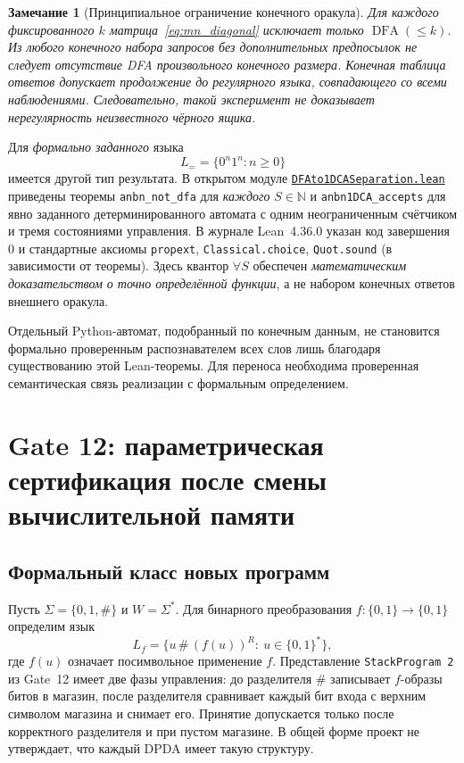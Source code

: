 \documentclass[11pt,a4paper]{article}
\newtheorem{remark}{Замечание}[section]
\newcommand{\DFA}{\operatorname{DFA}}
\begin{document}
\begin{remark}[Принципиальное ограничение конечного оракула]\label{rem:oracle}
Для каждого \emph{фиксированного} $k$ матрица~\eqref{eq:mn_diagonal} исключает только $\DFA(\le k)$. Из любого конечного набора запросов без дополнительных предпосылок \emph{не следует} отсутствие DFA произвольного конечного размера. Конечная таблица ответов допускает продолжение до регулярного языка, совпадающего со всеми наблюдениями. Следовательно, такой эксперимент не доказывает нерегулярность неизвестного чёрного ящика.
\end{remark}

Для \emph{формально заданного} языка
\begin{equation}\label{eq:anbn}
L_{=}=\{0^n1^n:n\ge0\}
\end{equation}
имеется другой тип результата. В открытом модуле \href{https://github.com/Dnarts/proof-carrying-discovery/blob/main/formal/DFAto1DCASeparation.lean}{\texttt{DFAto1DCASeparation.lean}} приведены теоремы \texttt{anbn\_not\_dfa} для \emph{каждого} $S\in\mathbb N$ и \texttt{anbn1DCA\_accepts} для явно заданного детерминированного автомата с одним неограниченным счётчиком и тремя состояниями управления. В журнале Lean~4.36.0 указан код завершения $0$ и стандартные аксиомы \texttt{propext}, \texttt{Classical.choice}, \texttt{Quot.sound} (в зависимости от теоремы). Здесь квантор $\forall S$ обеспечен \emph{математическим доказательством о точно определённой функции}, а не набором конечных ответов внешнего оракула.

Отдельный Python-автомат, подобранный по конечным данным, не становится формально проверенным распознавателем всех слов лишь благодаря существованию этой Lean-теоремы. Для переноса необходима проверенная семантическая связь реализации с формальным определением.


\section{Gate 12: параметрическая сертификация после смены вычислительной памяти}

\subsection{Формальный класс новых программ}

Пусть $\Sigma=\{0,1,\#\}$ и $W=\Sigma^*$. Для бинарного преобразования $f:\{0,1\}\to\{0,1\}$ определим язык
\begin{equation}\label{eq:mid-language}
L_f=\{u\,\#\,(f(u))^R:\ u\in\{0,1\}^*\},
\end{equation}
где $f(u)$ означает посимвольное применение $f$. Представление \texttt{StackProgram 2} из Gate~12 имеет две фазы управления: до разделителя \# записывает $f$-образы битов в магазин, после разделителя сравнивает каждый бит входа с верхним символом магазина и снимает его. Принятие допускается только после корректного разделителя и при пустом магазине. В общей форме проект не утверждает, что каждый DPDA имеет такую структуру.
\end{document}
